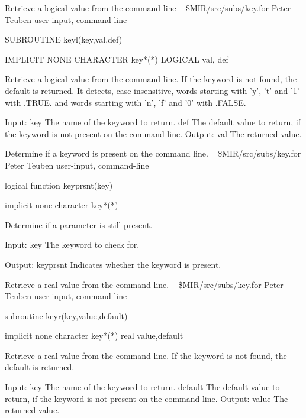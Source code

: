 %
\noindent Retrieve a logical value from the command line
\newline \ 
\newline {} \$MIR/src/subs/key.for
\newline {} Peter Teuben
\newline {} user-input, command-line
\par{\tenpoint
{\eightpoint\begintt
        SUBROUTINE keyl(key,val,def)

        IMPLICIT NONE
        CHARACTER key*(*)
        LOGICAL   val, def

 Retrieve a logical value from the command line. If the keyword is
 not found, the default is returned.
 It detects, case insensitive, words starting with 'y', 't' and '1'
 with .TRUE. and words starting with 'n', 'f' and '0' with .FALSE.

    Input:
        key      The name of the keyword to return.
        def      The default value to return, if the keyword is not present
                    on the command line.
      Output:
        val      The returned value.
\endtt}
\par}
%
\noindent Determine if a keyword is present on the command line.
\newline \ 
\newline \abox{File:} \$MIR/src/subs/key.for
\newline {} Peter Teuben
\newline \abox{Keywords:} user-input, command-line
\par{\tenpoint
{\eightpoint\begintt
        logical function keyprsnt(key)

        implicit none
        character key*(*)

  Determine if a parameter is still present.

  Input:
    key        The keyword to check for.

  Output:
    keyprsnt   Indicates whether the keyword is present.
\endtt}
\par}
%
\noindent Retrieve a real value from the command line.
\newline \ 
\newline {} \$MIR/src/subs/key.for
\newline \abox{Responsible:} Peter Teuben
\newline {} user-input, command-line
\par{\tenpoint
{\eightpoint\begintt
        subroutine keyr(key,value,default)

        implicit none
        character key*(*)
        real value,default

  Retrieve a real value from the command line. If the keyword is
  not found, the default is returned.

  Input:
    key        The name of the keyword to return.
    default    The default value to return, if the keyword is not present
               on the command line.
  Output:
    value      The returned value.
\endtt}
\par}
